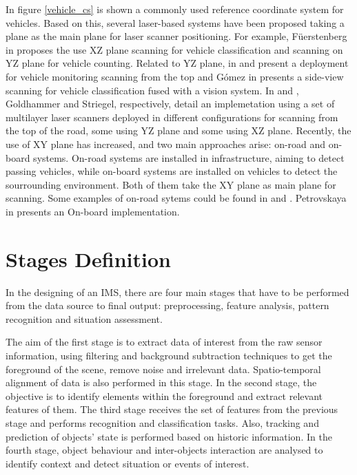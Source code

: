 \documentclass[10pt,twocolumn,letterpaper]{article}
\begin{document}
In figure \ref{vehicle_cs} is shown a commonly used reference coordinate system for vehicles. Based on this, several laser-based systems have been proposed taking a plane as the main plane for laser scanner positioning. For example, F{\"u}erstenberg in  \cite{Fuerstenberg2000} proposes the use XZ plane scanning for vehicle classification and scanning on YZ plane for vehicle counting. Related to YZ plane, in \cite{Harlow2001} and \cite{Vivet2013} present a deployment for vehicle monitoring scanning from the top and Gómez in \cite{Gomez2013} presents a side-view scanning for vehicle classification fused with a vision system. In \cite{Goldhammer2012} and \cite{Strigel2014}, Goldhammer and Striegel, respectively, detail an implemetation using a set of multilayer laser scanners deployed in different configurations for scanning from the top of the road, some using YZ plane and some using XZ plane. Recently, the use of XY plane has increased, and two main approaches arise: on-road and on-board systems. On-road systems are installed in infrastructure, aiming to detect passing vehicles, while on-board systems are installed on vehicles to detect the sourrounding environment. Both of them take the XY plane as main plane for scanning. Some examples of on-road sytems could be found in \cite{Zhao2006, Zhao2008, Zhao2009, Zhao2012} and \cite{Perng2014}. Petrovskaya in \cite{Petrovskaya2009} presents an On-board implementation.





\section{Stages Definition}
In the designing of an IMS, there are four main stages that have to be performed from the data source to final output: preprocessing, feature analysis, pattern recognition and situation assessment.

The aim of the first stage is to extract data of interest from the raw sensor information, using filtering and background subtraction techniques to get the foreground of the scene, remove noise and irrelevant data. Spatio-temporal alignment of data is also performed in this stage. In the second stage, the objective is to identify elements within the foreground and extract relevant features of them. The third stage receives the set of features from the previous stage and performs recognition and classification tasks. Also, tracking and prediction of objects' state is performed based on historic information. In the fourth stage, object behaviour and inter-objects interaction are analysed to identify context and detect situation or events of interest.
\end{document}
